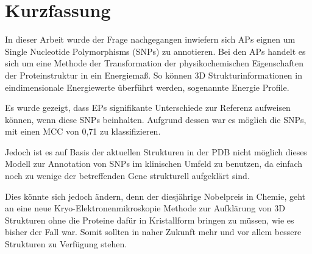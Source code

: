 
\chapter{Kurzfassung}

In dieser Arbeit wurde der Frage nachgegangen inwiefern sich \acf{APs} eignen um Single Nucleotide Polymorphisms (SNPs) zu annotieren. Bei den \ac{APs} handelt es sich um eine Methode der Transformation der physikochemischen Eigenschaften der Proteinstruktur in ein Energiemaß. So können 3D Strukturinformationen in eindimensionale Energiewerte überführt werden, sogenannte Energie Profile.

Es wurde gezeigt, dass \ac{EP}s signifikante Unterschiede zur Referenz aufweisen können, wenn diese SNPs beinhalten. Aufgrund dessen war es möglich die \ac{SNP}s, mit einen \ac{MCC} von 0,71 zu klassifizieren.

Jedoch ist es auf Basis der aktuellen Strukturen in der \ac{PDB} nicht möglich dieses Modell zur Annotation von \ac{SNP}s im klinischen Umfeld zu benutzen, da einfach noch zu wenige der betreffenden Gene strukturell aufgeklärt sind.

Dies könnte sich jedoch ändern, denn der diesjährige Nobelpreis in Chemie, geht an eine neue Kryo-Elektronenmikroskopie Methode zur Aufklärung von 3D Strukturen ohne die Proteine dafür in Kristallform bringen zu müssen, wie es bisher der Fall war. Somit sollten in naher Zukunft mehr und vor allem bessere Strukturen zu Verfügung stehen.

